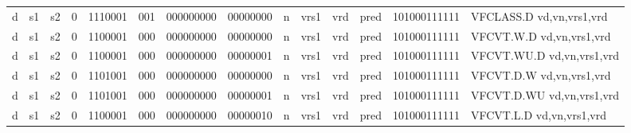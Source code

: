 \begin{landscape}
\begin{table}[p]
\begin{small}
\begin{center}
\begin{tabular}{p{0.08in}@{}p{0.08in}@{}p{0.08in}@{}p{0.08in}@{}p{0.50in}@{}p{0.30in}@{}p{0.08in}@{}p{0.8in}@{}p{0.48in}@{}p{0.32in}@{}p{0.08in}@{}p{0.8in}@{}p{0.8in}@{}p{0.4in}@{}p{0.56in}l}
\multicolumn{1}{|c|}{d} &
\multicolumn{1}{c|}{s1} &
\multicolumn{1}{c|}{s2} &
\multicolumn{1}{c|}{0} &
\multicolumn{1}{c|}{1110001} &
\multicolumn{1}{c|}{001} &
\multicolumn{2}{c|}{000000000} &
\multicolumn{2}{c|}{00000000} &
\multicolumn{1}{c|}{n} &
\multicolumn{1}{c|}{vrs1} &
\multicolumn{1}{c|}{vrd} &
\multicolumn{1}{c|}{pred} &
\multicolumn{1}{c|}{101000111111} & VFCLASS.D vd,vn,vrs1,vrd \\
\cline{1-15}
  

\multicolumn{1}{|c|}{d} &
\multicolumn{1}{c|}{s1} &
\multicolumn{1}{c|}{s2} &
\multicolumn{1}{c|}{0} &
\multicolumn{1}{c|}{1100001} &
\multicolumn{1}{c|}{000} &
\multicolumn{2}{c|}{000000000} &
\multicolumn{2}{c|}{00000000} &
\multicolumn{1}{c|}{n} &
\multicolumn{1}{c|}{vrs1} &
\multicolumn{1}{c|}{vrd} &
\multicolumn{1}{c|}{pred} &
\multicolumn{1}{c|}{101000111111} & VFCVT.W.D vd,vn,vrs1,vrd \\
\cline{1-15}
  

\multicolumn{1}{|c|}{d} &
\multicolumn{1}{c|}{s1} &
\multicolumn{1}{c|}{s2} &
\multicolumn{1}{c|}{0} &
\multicolumn{1}{c|}{1100001} &
\multicolumn{1}{c|}{000} &
\multicolumn{2}{c|}{000000000} &
\multicolumn{2}{c|}{00000001} &
\multicolumn{1}{c|}{n} &
\multicolumn{1}{c|}{vrs1} &
\multicolumn{1}{c|}{vrd} &
\multicolumn{1}{c|}{pred} &
\multicolumn{1}{c|}{101000111111} & VFCVT.WU.D vd,vn,vrs1,vrd \\
\cline{1-15}
  

\multicolumn{1}{|c|}{d} &
\multicolumn{1}{c|}{s1} &
\multicolumn{1}{c|}{s2} &
\multicolumn{1}{c|}{0} &
\multicolumn{1}{c|}{1101001} &
\multicolumn{1}{c|}{000} &
\multicolumn{2}{c|}{000000000} &
\multicolumn{2}{c|}{00000000} &
\multicolumn{1}{c|}{n} &
\multicolumn{1}{c|}{vrs1} &
\multicolumn{1}{c|}{vrd} &
\multicolumn{1}{c|}{pred} &
\multicolumn{1}{c|}{101000111111} & VFCVT.D.W vd,vn,vrs1,vrd \\
\cline{1-15}
  

\multicolumn{1}{|c|}{d} &
\multicolumn{1}{c|}{s1} &
\multicolumn{1}{c|}{s2} &
\multicolumn{1}{c|}{0} &
\multicolumn{1}{c|}{1101001} &
\multicolumn{1}{c|}{000} &
\multicolumn{2}{c|}{000000000} &
\multicolumn{2}{c|}{00000001} &
\multicolumn{1}{c|}{n} &
\multicolumn{1}{c|}{vrs1} &
\multicolumn{1}{c|}{vrd} &
\multicolumn{1}{c|}{pred} &
\multicolumn{1}{c|}{101000111111} & VFCVT.D.WU vd,vn,vrs1,vrd \\
\cline{1-15}
  

\multicolumn{1}{|c|}{d} &
\multicolumn{1}{c|}{s1} &
\multicolumn{1}{c|}{s2} &
\multicolumn{1}{c|}{0} &
\multicolumn{1}{c|}{1100001} &
\multicolumn{1}{c|}{000} &
\multicolumn{2}{c|}{000000000} &
\multicolumn{2}{c|}{00000010} &
\multicolumn{1}{c|}{n} &
\multicolumn{1}{c|}{vrs1} &
\multicolumn{1}{c|}{vrd} &
\multicolumn{1}{c|}{pred} &
\multicolumn{1}{c|}{101000111111} & VFCVT.L.D vd,vn,vrs1,vrd \\
\cline{1-15}
  


\end{tabular}
\end{center}
\end{small}
\end{table}
\end{landscape}
